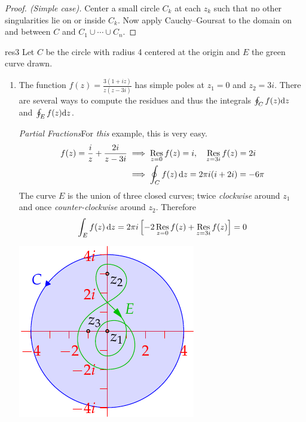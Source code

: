 \begin{proof}[Proof. (Simple case)]
Center a small circle $C_k$ at each $z_k$ such that no other singularities lie on or inside $C_k$. Now apply Cauchy--Goursat to the domain on and between $C$ and $C_1\cup\cdots\cup C_n$.
\end{proof}

\begin{examples}{}{res3}
Let $C$ be the circle with radius 4 centered at the origin and $E$ the green curve drawn.

\begin{enumerate}
  \item The function $f(z)=\frac{3(1+iz)}{z(z-3i)}$ has simple poles at $z_1=0$ and $z_2=3i$. There are several ways to compute the residues and thus the integrals $\oint_Cf(z){\mathrm{d} z}$ and $\oint_Ef(z){\mathrm{d} z}$.\smallbreak
\begin{minipage}[t]{0.67\linewidth}\vspace{-10pt}
\emph{Partial Fractions}\quad For \emph{this} example, this is very easy.
\begin{align*}
f(z)=\frac iz+\frac{2i}{z-3i} &\implies \operatorname*{Res}_{z=0} f(z)=i,\quad \operatorname*{Res}_{z=3i} f(z)=2i\\
&\implies \oint_Cf(z)\,{\mathrm{d} z}=2\pi i(i+2i)=-6\pi
\end{align*}
The curve $E$ is the union of three closed curves; twice \emph{clockwise} around $z_1$ and once  \emph{counter-clockwise} around $z_2$. Therefore
\[\int_Ef(z)\,{\mathrm{d} z}=2\pi i\left[-2\operatorname*{Res}_{z=0} f(z)+\operatorname*{Res}_{z=3i}f(z)\right] =0\]
\end{minipage}
\begin{minipage}[t]{0.32\linewidth}\vspace{0pt}
\flushright\includegraphics{res3}
\end{minipage}\medbreak


\end{enumerate}
\end{examples}
